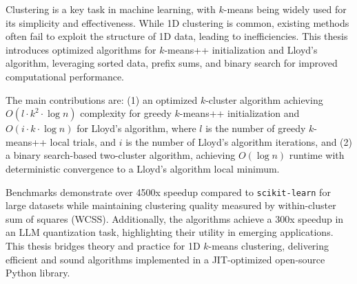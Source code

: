 \EnglishAbstractHeader

Clustering is a key task in machine learning, with $k$-means being widely used for its simplicity and effectiveness. While 1D clustering is common, existing methods often fail to exploit the structure of 1D data, leading to inefficiencies. This thesis introduces optimized algorithms for $k$-means++ initialization and Lloyd's algorithm, leveraging sorted data, prefix sums, and binary search for improved computational performance.

The main contributions are: (1) an optimized \(k\)-cluster algorithm achieving \(O(l \cdot k^2 \cdot \log n)\) complexity for greedy $k$-means++ initialization and \(O(i \cdot k \cdot \log n)\) for Lloyd's algorithm, where \(l\) is the number of greedy $k$-means++ local trials, and \(i\) is the number of Lloyd's algorithm iterations, and (2) a binary search-based two-cluster algorithm, achieving \(O(\log n)\) runtime with deterministic convergence to a Lloyd’s algorithm local minimum.

Benchmarks demonstrate over 4500x speedup compared to \texttt{scikit-learn} for large datasets while maintaining clustering quality measured by within-cluster sum of squares (WCSS). Additionally, the algorithms achieve a 300x speedup in an LLM quantization task, highlighting their utility in emerging applications. This thesis bridges theory and practice for 1D $k$-means clustering, delivering efficient and sound algorithms implemented in a JIT-optimized open-source Python library.

